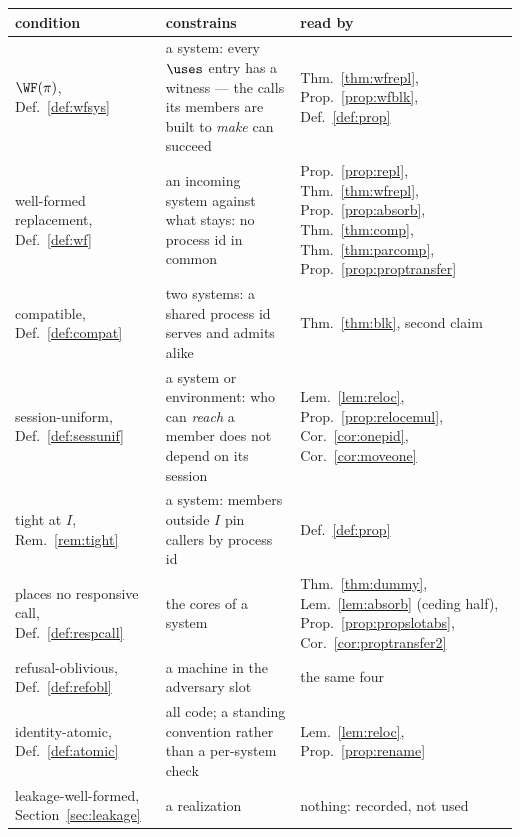 \documentclass[10pt,oneside,openany]{book}
\theoremstyle{accentdef}
\theoremstyle{accentplain}
\begin{document}
\begin{center}
\small
\begin{tabular}{@{}>{\raggedright\arraybackslash}p{} >{\raggedright\arraybackslash}p{} >{\raggedright\arraybackslash}p{}@{}}
\toprule
condition & constrains & read by \\
\midrule
$\WF(\pi)$, Def.~\ref{def:wfsys}
  & a system: every $\uses$ entry has a witness --- the calls its members are built to \emph{make} can succeed
  & Thm.~\ref{thm:wfrepl}, Prop.~\ref{prop:wfblk}, Def.~\ref{def:prop} \\[0.6ex]
well-formed replacement, Def.~\ref{def:wf}
  & an incoming system against what stays: no process id in common
  & Prop.~\ref{prop:repl}, Thm.~\ref{thm:wfrepl}, Prop.~\ref{prop:absorb}, Thm.~\ref{thm:comp}, Thm.~\ref{thm:parcomp}, Prop.~\ref{prop:proptransfer} \\[0.6ex]
compatible, Def.~\ref{def:compat}
  & two systems: a shared process id serves and admits alike
  & Thm.~\ref{thm:blk}, second claim \\[0.6ex]
session-uniform, Def.~\ref{def:sessunif}
  & a system or environment: who can \emph{reach} a member does not depend on its session
  & Lem.~\ref{lem:reloc}, Prop.~\ref{prop:relocemul}, Cor.~\ref{cor:onepid}, Cor.~\ref{cor:moveone} \\[0.6ex]
tight at $I$, Rem.~\ref{rem:tight}
  & a system: members outside $I$ pin callers by process id
  & Def.~\ref{def:prop} \\[0.6ex]
places no responsive call, Def.~\ref{def:respcall}
  & the cores of a system
  & Thm.~\ref{thm:dummy}, Lem.~\ref{lem:absorb} (ceding half), Prop.~\ref{prop:propslotabs}, Cor.~\ref{cor:proptransfer2} \\[0.6ex]
refusal-oblivious, Def.~\ref{def:refobl}
  & a machine in the adversary slot
  & the same four \\[0.6ex]
identity-atomic, Def.~\ref{def:atomic}
  & all code; a standing convention rather than a per-system check
  & Lem.~\ref{lem:reloc}, Prop.~\ref{prop:rename} \\[0.6ex]
leakage-well-formed, Section~\ref{sec:leakage}
  & a realization
  & nothing: recorded, not used \\
\bottomrule
\end{tabular}
\end{center}
\end{document}

